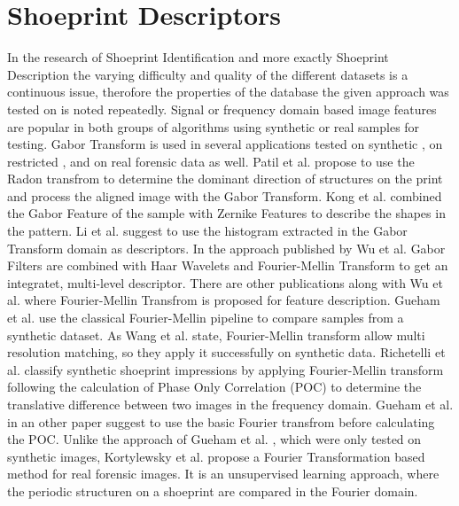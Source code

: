 \documentclass[draft,final]{vutinfth} %
\begin{document}
\section*{Shoeprint Descriptors}
\par
In the research of Shoeprint Identification and more exactly Shoeprint Description the varying difficulty and quality of the different datasets is a continuous issue, therofore the properties of the database the given approach was tested on is noted repeatedly.
Signal or frequency domain based image features are popular in both groups of algorithms using synthetic or real samples for testing.
Gabor Transform is used in several applications tested on synthetic \cite{patil2009rotation}, on restricted \cite{kong2014novel}, \cite{li2014retrieval} and on real forensic data \cite{wu2019crime} as well.
Patil et al. \cite{patil2009rotation} propose to use the Radon transfrom to determine the dominant direction of structures on the print and process the aligned image with the Gabor Transform.
Kong et al.  \cite{kong2014novel} combined the Gabor Feature of the sample with Zernike Features to describe the shapes in the pattern.
Li et al. \cite{li2014retrieval} suggest to use the histogram extracted in the Gabor Transform domain as descriptors.
In the approach published by Wu et al.  \cite{wu2019crime} Gabor Filters are combined with Haar Wavelets and Fourier-Mellin Transform to get an integratet, multi-level descriptor. 
There are other publications along with  Wu et al.  \cite{wu2019crime} where Fourier-Mellin Transfrom is proposed for feature description.
Gueham et al. \cite{gueham2008automatic} use the classical Fourier-Mellin pipeline to compare samples from a synthetic dataset.
As Wang et al. \cite{wang2014automatic} state, Fourier-Mellin transform allow multi resolution matching, so they apply it successfully on synthetic data.
Richetelli et al. \cite{richetelli2017classification} classify synthetic shoeprint impressions by applying Fourier-Mellin transform following the calculation of Phase Only Correlation (POC) to determine the translative difference between two images in the frequency domain.
Gueham et al. \cite{gueham2007automatic} in an other paper suggest to use the basic Fourier transfrom before calculating the POC.
Unlike the approach of Gueham et al. \cite{gueham2007automatic}, which were only tested on synthetic images, Kortylewsky et al. \cite{kortylewski2014unsupervised} propose a Fourier Transformation based method for real forensic images.
It is an unsupervised learning approach, where the periodic structuren on a shoeprint are compared in the Fourier domain.
\end{document}
